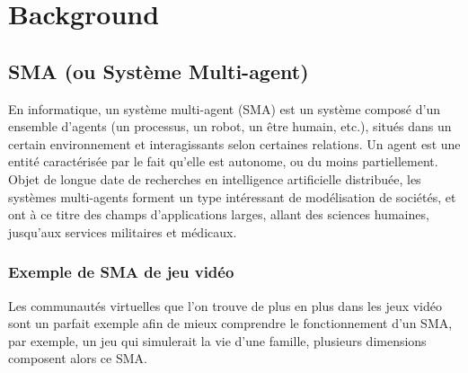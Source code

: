 
\chapter{Background} %

\label{Chapter3} %


\section{SMA (ou Système Multi-agent)}

En informatique, un système multi-agent (SMA) est un système composé d'un ensemble d'agents (un processus, un robot, un être humain, etc.), situés dans un certain environnement et interagissants selon certaines relations. Un agent est une entité caractérisée par le fait qu'elle est autonome, ou du moins partiellement.
Objet de longue date de recherches en intelligence artificielle distribuée, les systèmes multi-agents forment un type intéressant de modélisation de sociétés, et ont à ce titre des champs d'applications larges, allant des sciences humaines, jusqu’aux services militaires et médicaux. \parencite{sma}


\subsection{Exemple de SMA de jeu vidéo}

Les communautés virtuelles que l’on trouve de plus en plus dans les jeux vidéo sont un parfait exemple afin de mieux comprendre le fonctionnement d’un SMA, par exemple, un jeu qui simulerait la vie d’une famille, plusieurs dimensions composent alors ce SMA.

